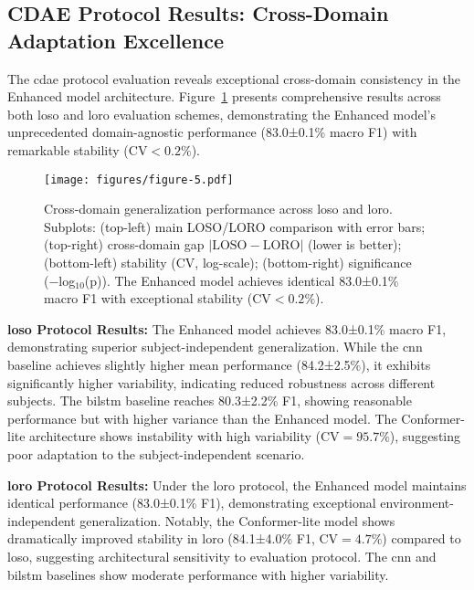 \documentclass[journal]{IEEEtran}
\begin{document}
\subsection{CDAE Protocol Results: Cross-Domain Adaptation Excellence}

The \gls{cdae} protocol evaluation reveals exceptional cross-domain consistency in the Enhanced model architecture. Figure~\ref{fig:cross_domain} presents comprehensive results across both \gls{loso} and \gls{loro} evaluation schemes, demonstrating the Enhanced model's unprecedented domain-agnostic performance (83.0±0.1\% macro F1) with remarkable stability ($\text{CV}<0.2\%$).

\begin{figure}[ht]
\centering
\texttt{[image: figures/figure-5.pdf]}%
\caption{Cross-domain generalization performance across \gls{loso} and \gls{loro}. Subplots: (top-left) main LOSO/LORO comparison with error bars; (top-right) cross-domain gap $|\text{LOSO}-\text{LORO}|$ (lower is better); (bottom-left) stability (CV, log-scale); (bottom-right) significance (−log$_{10}$(p)). The Enhanced model achieves identical 83.0±0.1\% macro F1 with exceptional stability ($\text{CV}<0.2\%$).}
\label{fig:cross_domain}
\end{figure}



\textbf{\gls{loso} Protocol Results:} The Enhanced model achieves 83.0±0.1\% macro F1, demonstrating superior subject-independent generalization. While the \gls{cnn} baseline achieves slightly higher mean performance (84.2±2.5\%), it exhibits significantly higher variability, indicating reduced robustness across different subjects. The \gls{bilstm} baseline reaches 80.3±2.2\% F1, showing reasonable performance but with higher variance than the Enhanced model. The Conformer-lite architecture shows instability with high variability ($\text{CV}=95.7\%$), suggesting poor adaptation to the subject-independent scenario.

\textbf{\gls{loro} Protocol Results:} Under the \gls{loro} protocol, the Enhanced model maintains identical performance (83.0±0.1\% F1), demonstrating exceptional environment-independent generalization. Notably, the Conformer-lite model shows dramatically improved stability in \gls{loro} (84.1±4.0\% F1, $\text{CV}=4.7\%$) compared to \gls{loso}, suggesting architectural sensitivity to evaluation protocol. The \gls{cnn} and \gls{bilstm} baselines show moderate performance with higher variability.
\end{document}
